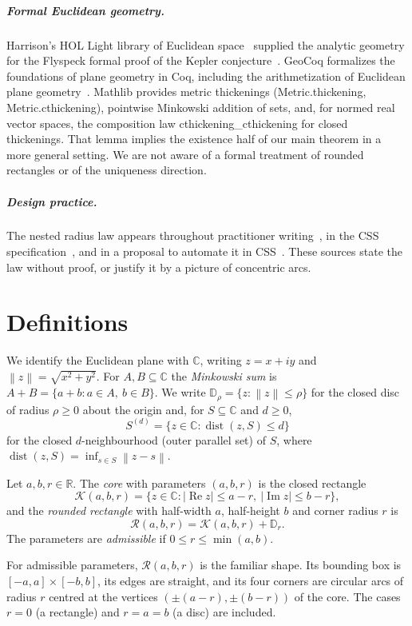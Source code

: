 \documentclass[a4paper,UKenglish,cleveref,autoref,thm-restate]{lipics-v2021}
\newcommand{\R}{\mathbb{R}}
\newcommand{\C}{\mathbb{C}}
\newcommand{\Disc}{\mathbb{D}}
\newcommand{\RR}{\mathcal{R}}
\newcommand{\Core}{\mathcal{K}}
\newcommand{\abs}[1]{\left\lvert #1 \right\rvert}
\newcommand{\norm}[1]{\left\lVert #1 \right\rVert}
\DeclareMathOperator{\dist}{dist}
\DeclareMathOperator{\ReOp}{Re}
\DeclareMathOperator{\ImOp}{Im}
\newcommand{\lean}[1]{{\leanfont #1}}
\begin{document}
\subparagraph*{Formal Euclidean geometry.} Harrison's HOL Light library of Euclidean
space~\cite{harrison2013} supplied the analytic geometry for the Flyspeck formal proof of the
Kepler conjecture~\cite{hales2017}. GeoCoq formalizes the foundations of plane geometry in Coq,
including the arithmetization of Euclidean plane geometry~\cite{boutry2019}. Mathlib provides
metric thickenings (\lean{Metric.thickening}, \lean{Metric.cthickening}), pointwise Minkowski
addition of sets, and, for normed real vector spaces, the composition law
\lean{cthickening\_cthickening} for closed thickenings. That lemma implies the existence half of
our main theorem in a more general setting. We are not aware of a formal treatment of rounded
rectangles or of the uniqueness direction.

\subparagraph*{Design practice.} The nested radius law appears throughout practitioner
writing~\cite{hebert2022,coyier2024}, in the CSS specification~\cite{css3backgrounds}, and in a
proposal to automate it in CSS~\cite{argyle2022}. These sources state the law without proof, or
justify it by a picture of concentric arcs.

\section{Definitions}\label{sec:defs}

We identify the Euclidean plane with $\C$, writing $z = x + iy$ and $\norm{z} = \sqrt{x^2 + y^2}$.
For $A, B \subseteq \C$ the \emph{Minkowski sum} is $A + B = \{a + b : a \in A,\ b \in B\}$. We
write $\Disc_\rho = \{z : \norm{z} \le \rho\}$ for the closed disc of radius $\rho \ge 0$ about the
origin and, for $S \subseteq \C$ and $d \ge 0$,
\[
  S^{(d)} = \{ z \in \C : \dist(z, S) \le d \}
\]
for the closed $d$-neighbourhood (outer parallel set) of $S$, where
$\dist(z, S) = \inf_{s \in S} \norm{z - s}$.

\begin{definition}\label{def:rr}
Let $a, b, r \in \R$. The \emph{core} with parameters $(a, b, r)$ is the closed rectangle
\[
  \Core(a, b, r) = \{ z \in \C : \abs{\ReOp z} \le a - r,\ \abs{\ImOp z} \le b - r \},
\]
and the \emph{rounded rectangle} with half-width $a$, half-height $b$ and corner radius $r$ is
\[
  \RR(a, b, r) = \Core(a, b, r) + \Disc_r .
\]
The parameters are \emph{admissible} if $0 \le r \le \min(a, b)$.
\end{definition}

For admissible parameters, $\RR(a, b, r)$ is the familiar shape. Its bounding box is
$[-a, a] \times [-b, b]$, its edges are straight, and its four corners are circular arcs of radius
$r$ centred at the vertices $(\pm(a - r), \pm(b - r))$ of the core. The cases $r = 0$ (a
rectangle) and $r = a = b$ (a disc) are included.
\end{document}
